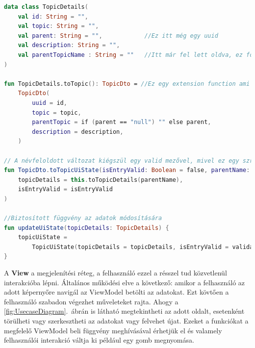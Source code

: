 \begin{lstlisting}[caption={Példa az dto átalakítására a valós UIon használt modellé és egy példa logikát leíró függvényre. Az eredeti dto: \ref{lst:Model}.~kódrészlet}, label={lst:TransformationAndFunction}, language=Kotlin]
data class TopicDetails(
    val id: String = "",
    val topic: String = "",
    val parent: String = "",            //Ez itt még egy uuid
    val description: String = "",
    val parentTopicName : String = ""   //Itt már fel lett oldva, ez fog a UI-on megjelenni
)

fun TopicDetails.toTopic(): TopicDto = //Ez egy extension function ami visszaalakítja a UIon mgejelenő adatot a REST API által kezelhrtő formára
    TopicDto(
        uuid = id,
        topic = topic,
        parentTopic = if (parent == "null") "" else parent,
        description = description,
    )

// A névfeloldott változat kiégszül egy valid mezővel, mivel ez egy szrekeszthető nézethez tartozó modell lesz
fun TopicDto.toTopicUiState(isEntryValid: Boolean = false, parentName: String): TopicUiState = TopicUiState(
    topicDetails = this.toTopicDetails(parentName),
    isEntryValid = isEntryValid
)

//Biztosított függvény az adatok módosítására
fun updateUiState(topicDetails: TopicDetails) {
    topicUiState =
        TopicUiState(topicDetails = topicDetails, isEntryValid = validateInput(topicDetails))
}
\end{lstlisting}


A \textbf{View} a megjelenítési réteg, a felhasználó ezzel a résszel tud közvetlenül interakcióba lépni. 
Általános működési elve a következő: amikor a felhasználó az adott képernyőre navigál az ViewModel betölti az adatokat.
Ezt kövtően a felhasználó szabadon végezhet műveleteket rajta. Ahogy a \ref{fig:UsecaseDiagram}.~ábrán is látható megtekintheti az adott oldalt, esetenként törülheti vagy szerkesztheti az adatokat vagy felvehet újat.
Ezeket a funkciókat a megfelelő ViewModel beli függvény meghívásával érhetjük el és valamely felhasználói interakció váltja ki például egy gomb megnyomása.

